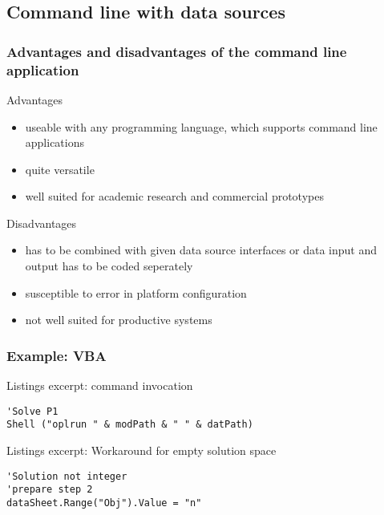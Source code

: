 \subsection{Command line with data sources}
\begin{frame}
 \frametitle{Advantages and disadvantages of the command line application}
 \footnotesize
 \begin{block}{Advantages}
  \begin{itemize}
   \item useable with any programming language, which supports command line applications
   \item quite versatile
   \item well suited for academic research and commercial prototypes
  \end{itemize}
 \end{block}
 \pause
 \begin{block}{Disadvantages}
  \begin{itemize}
   \item has to be combined with given data source interfaces or data input and output has to be coded seperately
   \item susceptible to error in platform configuration
   \item not well suited for productive systems
  \end{itemize}
 \end{block}
\end{frame}

\begin{frame}[fragile]
 \frametitle{Example: VBA}
 \begin{block}{Listings excerpt: command invocation}
  \begin{lstlisting}[language={[Visual]Basic},showstringspaces=false,numbers=none,basictype=\scriptsize\ttfamily]
'Solve P1
Shell ("oplrun " & modPath & " " & datPath)
  \end{lstlisting}
 \end{block}
 \begin{block}{Listings excerpt: Workaround for empty solution space}
    \begin{lstlisting}[language={[Visual]Basic},showstringspaces=false]
'Solution not integer
'prepare step 2
dataSheet.Range("Obj").Value = "n"
  \end{lstlisting}
 \end{block}
\end{frame}


